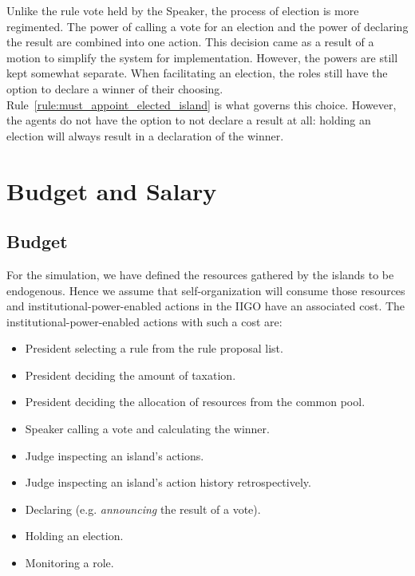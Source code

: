 Unlike the rule vote held by the Speaker, the process of election is more regimented. The power of calling a vote for an election and the power of declaring the result are combined into one action. This decision came as a result of a motion to simplify the system for implementation. However, the powers are still kept somewhat separate. When facilitating an election, the roles still have the option to declare a winner of their choosing. Rule~\ref{rule:must_appoint_elected_island} is what governs this choice. However, the agents do not have the option to not declare a result at all: holding an election will always result in a declaration of the winner.

\section{Budget and Salary}
\subsection{Budget}


For the simulation, we have defined the resources gathered by the islands to be endogenous. Hence we assume that self-organization will consume those resources and institutional-power-enabled actions in the IIGO have an associated cost. The institutional-power-enabled actions with such a cost are:





\begin{itemize}
\item President selecting a rule from the rule proposal list.
\item President deciding the amount of taxation.
\item President deciding the allocation of resources from the common pool.
\item Speaker calling a vote and calculating the winner.
\item Judge inspecting an island's actions.
\item Judge inspecting an island's action history retrospectively.
\item Declaring (e.g. \textit{announcing} the result of a vote).
\item Holding an election.
\item Monitoring a role.
\end{itemize}


